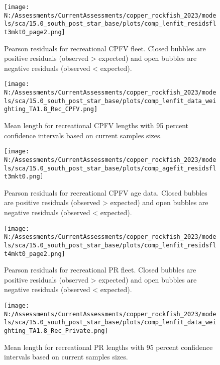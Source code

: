 \documentclass[11pt,
  english,
  letterpaper,
]{article}
\begin{document}
\pagebreak

\begin{figure}
\centering
\texttt{[image: N:/Assessments/CurrentAssessments/copper\_rockfish\_2023/models/sca/15.0\_south\_post\_star\_base/plots/comp\_lenfit\_residsflt3mkt0\_page2.png]}
\caption{Pearson residuals for recreational CPFV fleet. Closed bubbles are positive residuals (observed \textgreater{} expected) and open bubbles are negative residuals (observed \textless{} expected).\label{fig:rec-cpfv-pearson}}
\end{figure}

\pagebreak

\begin{figure}
\centering
\texttt{[image: N:/Assessments/CurrentAssessments/copper\_rockfish\_2023/models/sca/15.0\_south\_post\_star\_base/plots/comp\_lenfit\_data\_weighting\_TA1.8\_Rec\_CPFV.png]}
\caption{Mean length for recreational CPFV lengths with 95 percent confidence intervals based on current samples sizes.\label{fig:rec-cpfv-mean-len-fit}}
\end{figure}

\pagebreak

\begin{figure}
\centering
\texttt{[image: N:/Assessments/CurrentAssessments/copper\_rockfish\_2023/models/sca/15.0\_south\_post\_star\_base/plots/comp\_agefit\_residsflt3mkt0.png]}
\caption{Pearson residuals for recreational CPFV age data. Closed bubbles are positive residuals (observed \textgreater{} expected) and open bubbles are negative residuals (observed \textless{} expected).\label{fig:rec-cpfv-age-pearson}}
\end{figure}

\pagebreak

\begin{figure}
\centering
\texttt{[image: N:/Assessments/CurrentAssessments/copper\_rockfish\_2023/models/sca/15.0\_south\_post\_star\_base/plots/comp\_lenfit\_residsflt4mkt0\_page2.png]}
\caption{Pearson residuals for recreational PR fleet. Closed bubbles are positive residuals (observed \textgreater{} expected) and open bubbles are negative residuals (observed \textless{} expected).\label{fig:rec-pr-pearson}}
\end{figure}

\pagebreak

\begin{figure}
\centering
\texttt{[image: N:/Assessments/CurrentAssessments/copper\_rockfish\_2023/models/sca/15.0\_south\_post\_star\_base/plots/comp\_lenfit\_data\_weighting\_TA1.8\_Rec\_Private.png]}
\caption{Mean length for recreational PR lengths with 95 percent confidence intervals based on current samples sizes.\label{fig:rec-pr-mean-len-fit}}
\end{figure}
\end{document}
